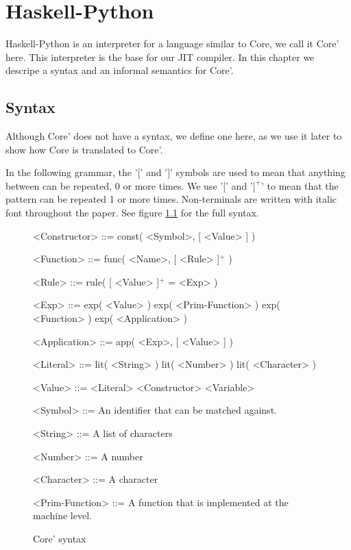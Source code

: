 
\chapter{Haskell-Python}
\label{chap:hs}


Haskell-Python is an interpreter for a language similar to Core, we call it Core' here.
This interpreter is the base for our JIT compiler. In this chapter we descripe a 
syntax and an informal semantics for Core'.

\section{Syntax}
\label{sec:syntax}

Although Core' does not have a syntax, we define one here, as we use it later 
to show how Core is translated to Core'.

In the following grammar, the '[' and ']' symbols are used to mean that
anything between can be repeated, 0 or more times. We use '[' and '$]^+$' to 
mean that the pattern can be repeated 1 or more times. Non-terminals are 
written with italic font throughout the paper.
See figure \ref{coresyn} for the full syntax.

\begin{figure}
\centering

\begin{grammar}

<Constructor> ::= const( <Symbol>, [ <Value> ] )

<Function> ::= func( <Name>, [ <Rule> ]$^+$ )

<Rule> ::= rule( [ <Value> ]$^+$ = <Exp> )

<Exp> ::= exp( <Value> )
     \alt exp( <Prim-Function> )
     \alt exp( <Function> )
     \alt exp( <Application> )

<Application> ::= app( <Exp>, [ <Value> ] )

<Literal> ::= lit( <String> )
	 \alt lit( <Number> )
	 \alt lit( <Character> )

<Value> ::= <Literal>
       \alt <Constructor>
       \alt <Variable>

<Symbol> ::= An identifier that can be matched against.

<String> ::= A list of characters

<Number> ::= A number

<Character> ::= A character

<Prim-Function> ::= A function that is implemented at the machine level.

\end{grammar}

\label{coresyn}
\caption{Core' syntax}
\end{figure}

